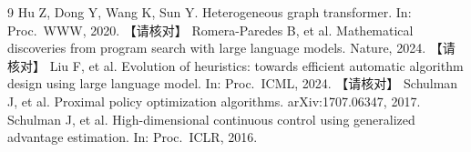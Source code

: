 \documentclass[12pt,a4paper]{article}
\begin{document}
\begin{thebibliography}{9}
 Hu Z, Dong Y, Wang K, Sun Y. Heterogeneous graph transformer. In: Proc.\ WWW, 2020. 【请核对】
 Romera-Paredes B, et al. Mathematical discoveries from program search with large language models. Nature, 2024. 【请核对】
 Liu F, et al. Evolution of heuristics: towards efficient automatic algorithm design using large language model. In: Proc.\ ICML, 2024. 【请核对】
 Schulman J, et al. Proximal policy optimization algorithms. arXiv:1707.06347, 2017.
 Schulman J, et al. High-dimensional continuous control using generalized advantage estimation. In: Proc.\ ICLR, 2016.
\end{thebibliography}
\end{document}
